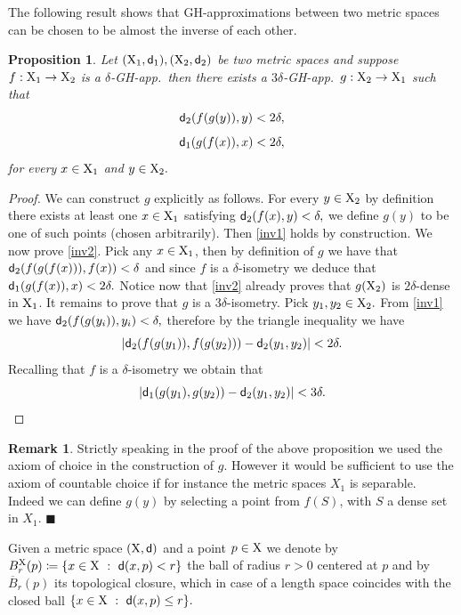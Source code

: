 \documentclass[11pt]{article}
\newcommand{\sfd}{{\sf d}}
\newcommand{\X}{{\rm X}}
\newcommand{\fr}{\penalty-20\null\hfill$\blacksquare$}
\theoremstyle{plain}
\newtheorem{prop}[theorem]{Proposition}
\theoremstyle{definition}
\newtheorem{remark}[theorem]{Remark}
\numberwithin{equation}{section}
\begin{document}
The following result shows that GH-approximations between two metric spaces can be chosen to be almost the inverse of each other.
\begin{prop}\label{apprinverse}
	Let $(\X_1,\sfd_1),(\X_2,\sfd_2)$ be two metric spaces and suppose $f: \X_1 \to \X_2$ is a $\delta$-GH-app.\ then there exists a $3\delta$-GH-app.\ $g: \X_2 \to \X_1$ such that 
	\begin{equation}\label{inv1}
		\sfd_2(f(g(y)),y)<2\delta ,
	\end{equation}
	\begin{equation}\label{inv2}
		\sfd_1(g(f(x)),x)< 2\delta,
	\end{equation}
	for every $x \in \X_1$ and $y \in \X_2.$
\end{prop}
\begin{proof}
	We can construct $g$ explicitly as follows. For every $y \in \X_2$ by definition there exists at least one $x\in \X_1$ satisfying $\sfd_2(f(x),y)<\delta,$ we define $g(y)$ to be one of such points (chosen arbitrarily). Then \eqref{inv1} holds by construction.  We now prove \eqref{inv2}. Pick any $x \in \X_1$, then by definition of $g$ we have that $\sfd_2(f(g(f(x))),f(x))<\delta $ and since $f$ is a $\delta$-isometry we deduce that $\sfd_1(g(f(x)),x)<2\delta.$ Notice now that \eqref{inv2} already proves that $g(\X_2)$ is $2\delta$-dense in $\X_1$. It remains to prove that $g$ is a $3\delta$-isometry. Pick $y_1,y_2 \in \X_2.$ From \eqref{inv1} we have $\sfd_2(f(g(y_i)),y_i)<\delta,$ therefore by the triangle inequality we have
	\[ |\sfd_2(f(g(y_1)),f(g(y_2)))-\sfd_2(y_1,y_2)|<2 \delta.\]
	Recalling that $f$ is a $\delta$-isometry we obtain that
	\[|\sfd_1(g(y_1),g(y_2))-\sfd_2(y_1,y_2)|<3\delta.\]
\end{proof}
\begin{remark}
    Strictly speaking in the proof of the above proposition we used the axiom of choice in the construction of $g$. However it would be sufficient to use the axiom of countable choice if for instance the metric spaces $X_1$ is separable. Indeed we can define $g(y)$ by selecting a point from $f(S)$, with $S$ a dense set in $X_1.$
    \fr
\end{remark}


Given a metric space $(\X,\sfd)$ and a point $p\in \X$ we denote by $B^{\X}_r(p)\coloneqq\{x \in \X \ : \ \sfd(x,p)<r\}$ the ball of radius $r>0$ centered at $p$ and by $\overline B_r(p)$ its topological closure, which in case of a length space coincides with the closed ball $\{x \in \X \ : \ \sfd(x,p)\le r\}.$ 
\end{document}
